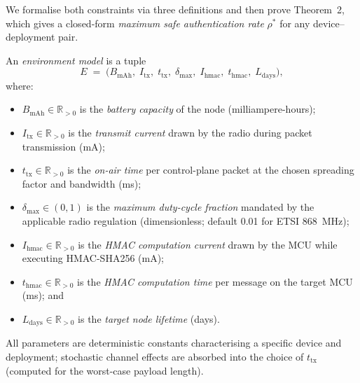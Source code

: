 We formalise both constraints via three definitions and then prove
Theorem~2, which gives a closed-form \emph{maximum safe authentication
rate} $\rho^*$ for any device--deployment pair.

\begin{definition}
\label{def:environment}
An \emph{environment model} is a tuple
\[
  E \;=\;
  \bigl(
    B_{\mathrm{mAh}},\;
    I_{\mathrm{tx}},\; t_{\mathrm{tx}},\;
    \delta_{\max},\;
    I_{\mathrm{hmac}},\; t_{\mathrm{hmac}},\;
    L_{\mathrm{days}}
  \bigr),
\]
where:
\begin{itemize}
  \item $B_{\mathrm{mAh}} \in \mathbb{R}_{>0}$ is the \emph{battery
        capacity} of the node (milliampere-hours);

  \item $I_{\mathrm{tx}} \in \mathbb{R}_{>0}$ is the \emph{transmit
        current} drawn by the radio during packet transmission (mA);

  \item $t_{\mathrm{tx}} \in \mathbb{R}_{>0}$ is the \emph{on-air time}
        per control-plane packet at the chosen spreading factor and
        bandwidth (ms);

  \item $\delta_{\max} \in (0, 1)$ is the \emph{maximum duty-cycle
        fraction} mandated by the applicable radio regulation
        (dimensionless; default 0.01 for ETSI 868~MHz);

  \item $I_{\mathrm{hmac}} \in \mathbb{R}_{>0}$ is the \emph{HMAC
        computation current} drawn by the MCU while executing
        HMAC-SHA256 (mA);

  \item $t_{\mathrm{hmac}} \in \mathbb{R}_{>0}$ is the \emph{HMAC
        computation time} per message on the target MCU (ms); and

  \item $L_{\mathrm{days}} \in \mathbb{R}_{>0}$ is the \emph{target
        node lifetime} (days).
\end{itemize}
All parameters are deterministic constants characterising a specific
device and deployment; stochastic channel effects are absorbed into the
choice of $t_{\mathrm{tx}}$ (computed for the worst-case payload length).
\end{definition}


